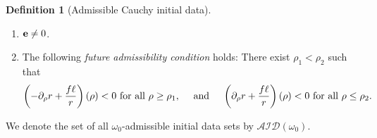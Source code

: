 \documentclass[10pt, reqno]{amsart}
\theoremstyle{definition}
\newtheorem{definition}[theorem]{Definition}
\theoremstyle{remark}
\theoremstyle{conjecture}
\numberwithin{equation}{section}
\newcommand{\rd}{\partial}
\newcommand{\0}{\emptyset}
\newcommand{\omg}{\omega}
\newcommand{\bfe}{{\bf e}}
\newcommand{\calA}{\mathcal A}
\newcommand{\calD}{\mathcal D}
\newcommand{\calI}{\mathcal I}
\newcommand{\e}{\bfe}							%
\begin{document}
\begin{definition} [Admissible Cauchy initial data]
\begin{enumerate}
\begin{equation}
\begin{aligned}
\end{aligned}
\end{equation}
\item $\e\neq 0$.
\item The following \emph{future admissibility condition} holds: There exist $\rho_1< \rho_2$ such that 
\begin{equation} \label{eq:adm-id-adm}
	\left(- \rd_{\rho} r + \frac{f \ell}{r}  \right) (\rho) < 0 \hbox{ for all } \rho \geq \rho_{1}, \quad \hbox{ and } \quad
	\left(\rd_{\rho} r + \frac{f \ell}{r}\right) (\rho) < 0 \hbox{ for all } \rho \leq \rho_{2}.
\end{equation}
\end{enumerate}
We denote the set of all $\omg_{0}$-admissible initial data sets by $\calA \calI \calD(\omg_{0})$.
\end{definition}
\end{document}
